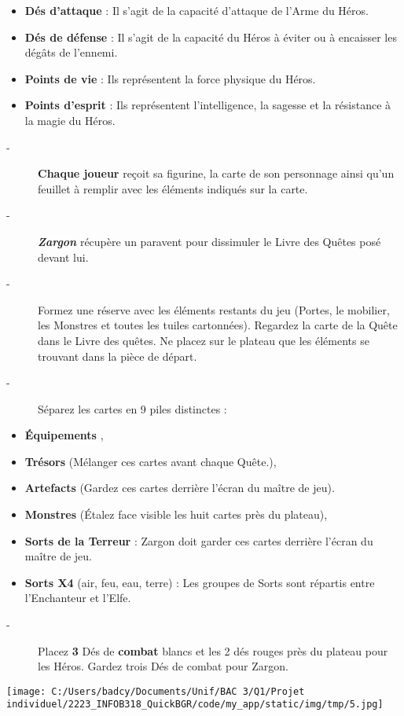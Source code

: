 \documentclass{scrartcl}%
\begin{document}
\begin{itemize}%
\item%
%
\textbf{ Dés d’attaque}%
\textit{ }%
 : Il s'agit de la capacité d'attaque de l'Arme du Héros.
%
\item%
%
\textbf{Dés de défense}%
\textit{ }%
 : Il s'agit de la capacité du Héros à éviter ou à encaisser les dégâts de l'ennemi.
%
\item%
%
\textbf{Points de vie}%
\textit{ }%
 : Ils représentent la force physique du Héros.
%
\item%
%
\textbf{Points d'esprit}%
\textit{ }%
 : Ils représentent l'intelligence, la sagesse et la résistance à la magie du Héros.
%
\end{itemize}%
\begin{description}%
\item[{-} ]%
%
\textbf{Chaque joueur}%
\textit{ }%
 reçoit sa figurine, la carte de son personnage ainsi qu'un feuillet à remplir avec les éléments indiqués sur la carte.
%
\item[{-} ]%
%
\textbf{\textit{ Zargon}}%
\textit{ }%
 récupère un paravent pour dissimuler le Livre des Quêtes posé devant lui.
%
\item[{-} ]%
%
 Formez une réserve avec les éléments restants du jeu (Portes, le mobilier, les Monstres et toutes les tuiles cartonnées). Regardez la carte de la Quête dans le Livre des quêtes. Ne placez sur le plateau que les éléments se trouvant dans la pièce de départ.
%
\item[{-} ]%
%
 Séparez les cartes en 9 piles distinctes :
%
\end{description}%
\begin{itemize}%
\item%
%
\textbf{Équipements}%
,
%
\item%
%
\textbf{Trésors}%
\textit{ }%
 (Mélanger ces cartes avant chaque Quête.),
%
\item%
%
\textbf{Artefacts}%
\textit{ }%
 (Gardez ces cartes derrière l'écran du maître de jeu).
%
\item%
%
\textbf{Monstres}%
\textit{ }%
 (Étalez face visible les huit cartes près du plateau),
%
\item%
%
\textbf{Sorts de la Terreur}%
\textit{ }%
 : Zargon doit garder ces cartes derrière l'écran du maître de jeu.
%
\item%
%
\textbf{Sorts X4}%
\textit{ }%
 (air, feu, eau, terre) : Les groupes de Sorts sont répartis entre l'Enchanteur et l'Elfe.
%
\end{itemize}%
\begin{description}%
\item[{-} ]%
%
 Placez %
\textbf{3}%
\textit{ }%
 Dés de %
\textbf{combat}%
\textit{ }%
 blancs et les 2 dés rouges près du plateau pour les Héros. Gardez trois Dés de combat pour Zargon.
%
\end{description}%
%
\begin{center}\texttt{[image: C:/Users/badcy/Documents/Unif/BAC 3/Q1/Projet individuel/2223\_INFOB318\_QuickBGR/code/my\_app/static/img/tmp/5.jpg]}\end{center}%
\end{document}
